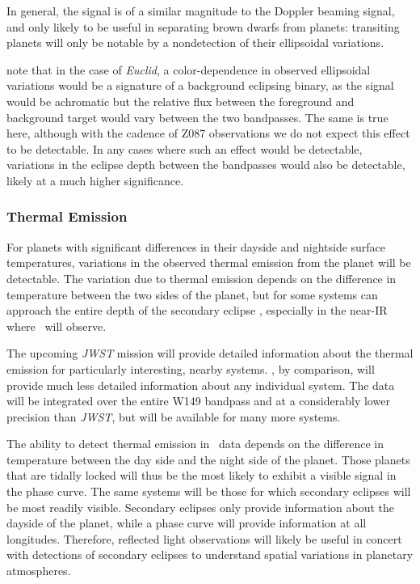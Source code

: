 In general, the signal is of a similar magnitude to the Doppler beaming
signal, and only likely to be useful in separating brown dwarfs from planets:
transiting planets will only be notable by a nondetection of their ellipsoidal 
variations.

\citet{McDonald14} note that in the case of \textit{Euclid}, a color-dependence in observed
ellipsoidal variations would be a signature of a background eclipsing binary,
as the signal would be achromatic but the relative flux between the foreground 
and background target would vary between the two bandpasses. 
The same is true here, although with the cadence of Z087 observations we do not expect
this effect to be detectable.
In any cases where such an effect would be detectable, variations in the eclipse depth
between the bandpasses would also be detectable, likely at a much higher significance.




\subsubsection{Thermal Emission}


For planets with significant differences in their dayside and nightside 
surface temperatures, variations in the observed thermal emission from the planet will be
detectable.
The variation due to thermal emission depends on the difference in temperature between
the two sides of the planet, but for some systems can approach the entire depth of the
secondary eclipse \citep{Stevenson14a}, especially in the near-IR where \WF\ will observe.

The upcoming \textit{JWST} mission will provide detailed information about the 
thermal emission for particularly interesting, nearby systems. 
\WF, by comparison, will provide much less detailed information about any individual
system.
The data will be integrated over the entire W149 bandpass and at a considerably lower
precision than \textit{JWST}, but will be available for many more systems.

The ability to detect thermal emission in \WF\ data depends on the difference in temperature
between the day side and the night side of the planet.
Those planets that are tidally locked will thus be the most likely to exhibit a visible
signal in the phase curve. 
The same systems will be those for which secondary eclipses will be most readily visible.
Secondary eclipses only provide information about the dayside of the planet, while a 
phase curve will provide information at all longitudes.
Therefore, reflected light observations will likely be useful in concert with detections
of secondary eclipses to understand spatial variations in planetary atmospheres.

